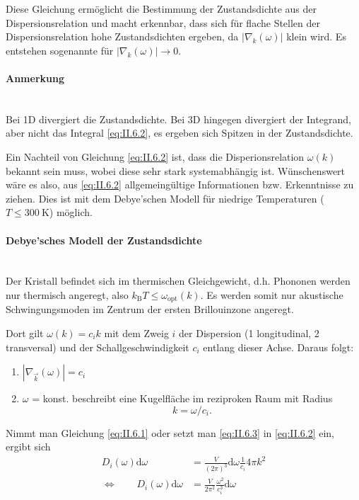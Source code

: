 	Diese Gleichung ermöglicht die Bestimmung der Zustandsdichte aus der Dispersionsrelation und macht erkennbar, dass sich für flache Stellen der Dispersionsrelation hohe Zustandsdichten ergeben, da $\left| \nabla _{k} (\omega) \right| $ klein wird. Es entstehen sogenannte  für $\left| \nabla _{k}(\omega) \right| \to 0$.

\paragraph{Anmerkung}\,\\ 
	Bei 1D divergiert die Zustandsdichte. Bei 3D hingegen divergiert der Integrand, aber nicht das Integral \eqref{eq:II.6.2}, es ergeben sich Spitzen in der Zustandsdichte.

	Ein Nachteil von Gleichung \eqref{eq:II.6.2} ist, dass die Disperionsrelation $\omega(k)$ bekannt sein muss, wobei diese sehr stark systemabhängig ist. 
	Wünschenswert wäre es also, aus \eqref{eq:II.6.2} allgemeingültige Informationen bzw. Erkenntnisse zu ziehen. 
	Dies ist mit dem Debye'schen Modell für niedrige Temperaturen ($T \le \SI{300}{\kelvin}$) möglich. 

\paragraph{Debye'sches Modell der Zustandsdichte}\,\\ 
	Der Kristall befindet sich im thermischen Gleichgewicht, d.h. Phononen werden nur thermisch angeregt, also $k_{\mathrm{B}}T \le \omega_{\text{opt}} (k)$. 
	Es werden somit nur akustische Schwingungsmoden im Zentrum der ersten Brillouinzone angeregt.

	Dort gilt $\omega(k) = c_{i} k$ mit dem Zweig $i$ der Dispersion (1 longitudinal, 2 transversal) und der Schallgeschwindigkeit $c_{i}$ entlang dieser Achse.
	Daraus folgt:
	\begin{enumerate}
		\item $\left| \nabla _{\Vec{k}} (\omega) \right| = c_{i}$ 
		\item $\omega$ = konst. beschreibt eine Kugelfläche im reziproken Raum mit Radius
			\begin{equation}
				\label{eq:II.6.3}
				k = \omega / c_{i}.
			\end{equation} 
	\end{enumerate}
	Nimmt man Gleichung \eqref{eq:II.6.1} oder setzt man \eqref{eq:II.6.3} in \eqref{eq:II.6.2} ein, ergibt sich
	\begin{align}
		\nonumber
		D_{i}(\omega) \mathrm{d}\omega &= \frac{V}{\left( 2\pi \right) ^3} \mathrm{d} \omega \frac{1}{c_{i}} 4 \pi k^2\\
		\label{eq:II.6.4}
		\Leftrightarrow\qquad D_{i} (\omega) \mathrm{d}\omega &= \frac{V}{2\pi^2} \frac{\omega^2}{c_{i}^3} \mathrm{d}\omega
	\end{align}

